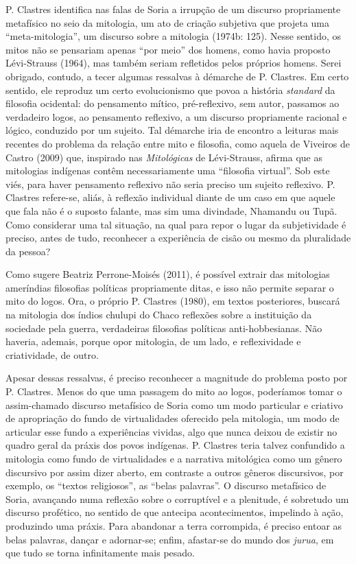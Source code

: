 {{P. Clastres identifica nas falas de Soria a irrupção de um discurso
propriamente metafísico no seio da mitologia, um ato de criação
subjetiva que projeta uma ``meta-mitologia'', um discurso sobre a
mitologia (1974b: 125). Nesse sentido, os mitos não se pensariam apenas
``por meio'' dos homens, como havia proposto Lévi-Strauss (1964), mas
também seriam refletidos pelos próprios homens. Serei obrigado,
contudo, a tecer algumas ressalvas à démarche de P. Clastres. Em certo
sentido, ele reproduz um certo evolucionismo que povoa a história
\emph{standard} da filosofia ocidental: do pensamento mítico, pré-reflexivo,
sem autor, passamos ao verdadeiro logos, ao pensamento reflexivo, a um
discurso propriamente racional e lógico, conduzido por um sujeito. Tal
démarche iria de encontro a leituras mais recentes do problema da
relação entre mito e filosofia, como aquela de Viveiros de Castro
(2009) que, inspirado nas \emph{Mitológicas} de Lévi-Strauss, afirma que as
mitologias indígenas contêm necessariamente uma ``filosofia virtual''.
Sob este viés, para haver pensamento reflexivo não seria preciso um
sujeito reflexivo. P. Clastres refere-se, aliás, à reflexão individual
diante de um caso em que aquele que fala não é o suposto falante, mas
sim uma divindade, Nhamandu ou Tupã. Como considerar uma tal situação,
na qual para repor o lugar da subjetividade é preciso, antes de tudo,
reconhecer a experiência de cisão ou mesmo da pluralidade da pessoa?

Como sugere Beatriz Perrone-Moisés (2011), é possível extrair das
mitologias ameríndias filosofias políticas propriamente ditas, e isso
não permite separar o mito do logos. Ora, o próprio P. Clastres (1980),
em textos posteriores, buscará na mitologia dos índios chulupi do Chaco
reflexões sobre a instituição da sociedade pela guerra, verdadeiras
filosofias políticas anti-hobbesianas. Não haveria, ademais, porque opor
mitologia, de um lado, e reflexividade e criatividade, de outro.

Apesar dessas ressalvas, é preciso reconhecer a magnitude do problema
posto por P. Clastres. Menos do que uma passagem do mito ao logos,
poderíamos tomar o assim-chamado discurso metafísico de Soria como um
modo particular e criativo de apropriação do fundo de virtualidades
oferecido pela mitologia, um modo de articular esse fundo a
experiências vividas, algo que nunca deixou de existir no quadro geral
da práxis dos povos indígenas. P. Clastres teria talvez confundido a
mitologia como fundo de virtualidades e a narrativa mitológica como um
gênero discursivo por assim dizer aberto, em contraste a outros gêneros
discursivos, por exemplo, os ``textos religiosos'', as ``belas palavras''.
O discurso metafísico de Soria, avançando numa reflexão sobre o
corruptível e a plenitude, é sobretudo um discurso profético, no
sentido de que antecipa acontecimentos, impelindo à ação, produzindo
uma práxis. Para abandonar a terra corrompida, é preciso entoar as
belas palavras, dançar e adornar-se; enfim, afastar-se do mundo dos
\emph{jurua}, em que tudo se torna infinitamente mais pesado. 

}}
